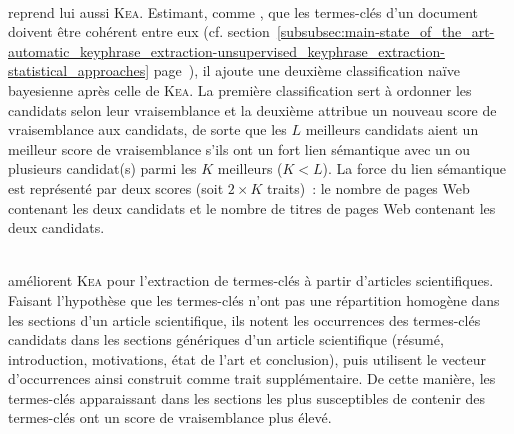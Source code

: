         ~\\ reprend lui aussi \textsc{Kea}.
        Estimant, comme , que les
        termes-clés d'un document doivent être cohérent entre eux (cf.
        section~\ref{subsubsec:main-state_of_the_art-automatic_keyphrase_extraction-unsupervised_keyphrase_extraction-statistical_approaches}
        page~\pageref{subsubsec:main-state_of_the_art-automatic_keyphrase_extraction-unsupervised_keyphrase_extraction-statistical_approaches:ilp}),
        il ajoute une deuxième classification naïve bayesienne après celle de
        \textsc{Kea}. La première classification sert à ordonner les candidats
        selon leur vraisemblance et la deuxième attribue un nouveau score de
        vraisemblance aux candidats, de sorte que les $L$ meilleurs candidats
        aient un meilleur score de vraisemblance s'ils ont un fort lien
        sémantique avec un ou plusieurs candidat(s) parmi les $K$ meilleurs ($K
        < L$). La force du lien sémantique est représenté par deux scores (soit
        $2 \times K$ traits)~: le nombre de pages Web contenant les deux
        candidats et le nombre de titres de pages Web contenant les deux
        candidats.

        ~\\ améliorent \textsc{Kea} pour
        l'extraction de termes-clés à partir d'articles scientifiques. Faisant
        l'hypothèse que les termes-clés n'ont pas une répartition homogène dans
        les sections d'un article scientifique, ils notent les occurrences des
        termes-clés candidats dans les sections génériques d'un article
        scientifique (résumé, introduction, motivations, état de l'art et
        conclusion), puis utilisent le vecteur d'occurrences ainsi construit
        comme trait supplémentaire. De cette manière, les termes-clés
        apparaissant dans les sections les plus susceptibles de contenir des
        termes-clés ont un score de vraisemblance plus élevé.
        
